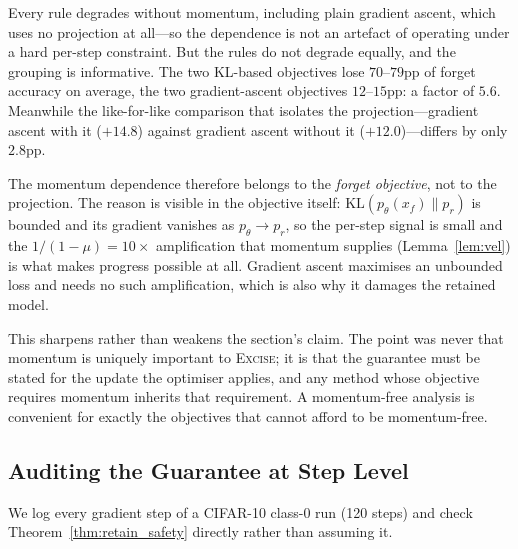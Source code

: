\documentclass{article}
\newcommand{\ours}{\textsc{Excise}}
\newcommand{\KL}{\mathrm{KL}}
\theoremstyle{remark}
\theoremstyle{plain}
\begin{document}
Every rule degrades without momentum, including plain gradient ascent, which
uses no projection at all---so the dependence is not an artefact of operating
under a hard per-step constraint. But the rules do not degrade equally, and the
grouping is informative. The two KL-based objectives lose $70$--$79$pp of forget
accuracy on average, the two gradient-ascent objectives $12$--$15$pp: a factor
of $5.6$. Meanwhile the like-for-like comparison that isolates the
projection---gradient ascent with it ($+14.8$) against gradient ascent without
it ($+12.0$)---differs by only $2.8$pp.

The momentum dependence therefore belongs to the \emph{forget objective}, not to
the projection. The reason is visible in the objective itself: $\KL(p_\theta(x_f)
\| p_r)$ is bounded and its gradient vanishes as $p_\theta \to p_r$, so the
per-step signal is small and the $1/(1-\mu) = 10\times$ amplification that
momentum supplies (Lemma~\ref{lem:vel}) is what makes progress possible at
all. Gradient ascent maximises an unbounded loss and needs no such
amplification, which is also why it damages the retained model.

This sharpens rather than weakens the section's claim. The point was never that
momentum is uniquely important to \ours{}; it is that the guarantee must be
stated for the update the optimiser applies, and any method whose objective
requires momentum inherits that requirement. A momentum-free analysis is
convenient for exactly the objectives that cannot afford to be momentum-free.

\subsection{Auditing the Guarantee at Step Level}\label{sec:alignment}

We log every gradient step of a CIFAR-10 class-0 run (120 steps) and check
Theorem~\ref{thm:retain_safety} directly rather than assuming it.
\end{document}
